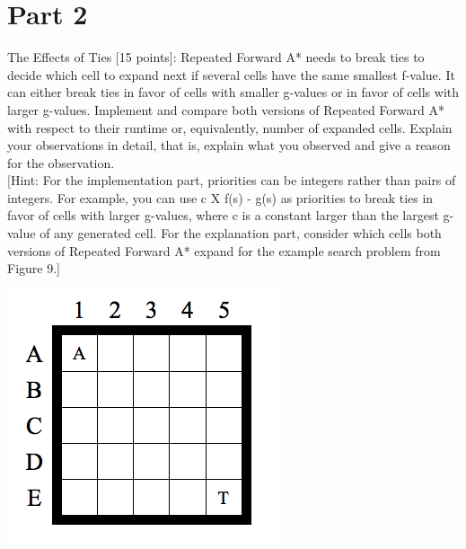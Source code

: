 \documentclass[preprint,12pt,3p]{elsarticle}
\begin{document}

\section{Part 2}
\label{sec2}

The Effects of Ties [15 points]: Repeated Forward A* needs to break ties to decide which cell to expand next if several cells have the same smallest f-value. It can either break ties in favor of cells with smaller g-values or in favor of cells with larger g-values. Implement and compare both versions of Repeated Forward A* with respect to their runtime or, equivalently, number of expanded cells. Explain your observations in detail, that is, explain what you observed and give a reason for the observation.\\ 

[Hint: For the implementation part, priorities can be integers rather than pairs of integers. For example, you can use c X f(s) - g(s) as priorities to break ties in favor of cells with larger g-values, where c is a constant larger than the largest g-value of any generated cell. For the explanation part, consider which cells both versions of Repeated Forward A* expand for the example search problem from Figure 9.]\\

\graphicspath{ {images/} }

\includegraphics{graph3}
\end{document}
